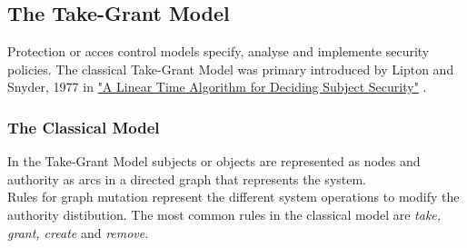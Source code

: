 \subsection{The Take-Grant Model}	
Protection or acces control models specify, analyse and implemente security policies. 
The classical Take-Grant Model was primary introduced by Lipton and Snyder, 1977 in  \href{https://www.cs.nmt.edu/~doshin/t/s06/cs589/pub/2.JLS-TG.pdf}{%
"A Linear Time Algorithm for Deciding Subject Security"} \cite{1TG}.
\subsubsection{The Classical Model}
In the Take-Grant Model \cite{TakeG} subjects or objects are represented as nodes and authority as arcs in a directed graph that represents the system. \\ 
Rules for graph mutation represent the different system operations to modify  the authority distibution. 
The most common rules in the classical model are \textit{take, grant, create} and \textit{remove}. 
	
